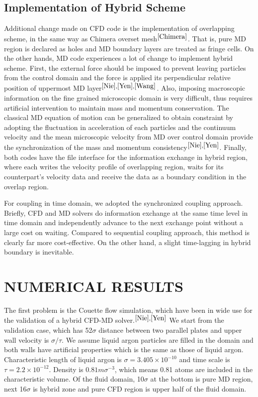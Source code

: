 \documentclass{CFD2010paper}
\begin{document}
\subsection{Implementation of Hybrid Scheme}
Additional change made on CFD code is the implementation of overlapping scheme, in the same way as Chimera overset mesh$^{\cite{Chimera}}$. That is, pure MD region is declared as holes and MD boundary layers are treated as fringe cells. On the other hands, MD code experiences a lot of change to implement hybrid scheme. First, the external force should be imposed to prevent leaving particles from the control domain and the force is applied its perpendicular relative position of uppermost MD layer$^{\cite{Nie},\cite{Yen},\cite{Wang}}$. Also, imposing macroscopic information on the fine grained microscopic domain is very difficult, thus requires artificial intervention to maintain mass and momentum conservation. The classical MD equation of motion can be generalized to obtain constraint by adopting the fluctuation in acceleration of each particles and the continuum velocity and the mean microscopic velocity from MD over control domain provide the synchronization of the mass and momentum consistency$^{\cite{Nie},\cite{Yen}}$. Finally, both codes have the file interface for the information exchange in hybrid region, where each writes the velocity profile of overlapping region, waits for its counterpart's velocity data and receive the data as a boundary condition in the overlap region.

For coupling in time domain, we adopted the synchronized coupling approach. Briefly, CFD and MD solvers do information exchange at the same time level in time domain and independently advance to the next exchange point without a large cost on waiting. Compared to sequential coupling approach, this method is clearly far more cost-effective. On the other hand, a slight time-lagging in hybrid boundary is inevitable.



\section{NUMERICAL RESULTS}

The first problem is the Couette flow simulation, which have been in wide use for the validation of a hybrid CFD-MD solver.$^{\cite{Nie},\cite{Yen}}$ We start from the validation case, which has 52$\sigma$ distance between two parallel plates and upper wall velocity is ${\sigma}/{\tau}$. We assume liquid argon particles are filled in the domain and both walls have artificial properties which is the same as those of liquid argon. Characteristic length of liquid argon is ${\sigma}=3.405{\times}10^{-10}$ and time scale is $\tau=2.2{\times}10^{-12}$. Density is $0.81m{\sigma}^{-3}$, which means 0.81 atoms are included in the characteristic volume. Of the fluid domain, 10$\sigma$ at the bottom is pure MD region, next 16$\sigma$ is hybrid zone and pure CFD region is upper half of the fluid domain.
\end{document}

